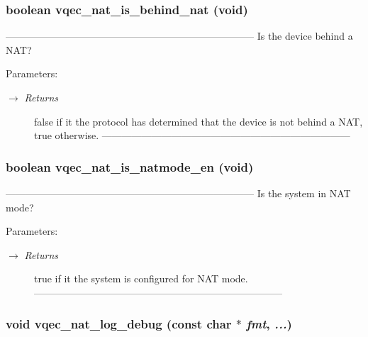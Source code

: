 \subsubsection{\setlength{\rightskip}{0pt plus 5cm}boolean vqec\_\-nat\_\-is\_\-behind\_\-nat (void)}\label{vqec__nat__api_8c_fcb807b3a55de54bfa848411d6bb1c34}


--------------------------------------------------------------------------- Is the device behind a NAT?

\begin{Desc}
\item[Parameters:]
\begin{description}
\item[\mbox{$\rightarrow$} {\em Returns}]false if it the protocol has determined that the device is not behind a NAT, true otherwise. --------------------------------------------------------------------------- \end{description}
\end{Desc}
\subsubsection{\setlength{\rightskip}{0pt plus 5cm}boolean vqec\_\-nat\_\-is\_\-natmode\_\-en (void)}\label{vqec__nat__api_8c_3633769cdfeadc830826ee6ff1da092d}


--------------------------------------------------------------------------- Is the system in NAT mode?

\begin{Desc}
\item[Parameters:]
\begin{description}
\item[\mbox{$\rightarrow$} {\em Returns}]true if it the system is configured for NAT mode. --------------------------------------------------------------------------- \end{description}
\end{Desc}
\subsubsection{\setlength{\rightskip}{0pt plus 5cm}void vqec\_\-nat\_\-log\_\-debug (const char $\ast$ {\em fmt},  {\em ...})}\label{vqec__nat__api_8c_216ead5a9e5e1d509a76963c6963d1f6}


